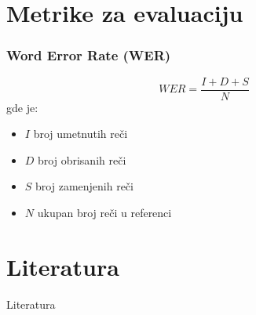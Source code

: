 \documentclass{beamer}
\begin{document}
\section{Metrike za evaluaciju}
\begin{frame}
  \frametitle{Word Error Rate (WER)}

  \begin{equation*}
    WER = \frac{I + D + S}{N}
  \end{equation*}
  gde je:
  \begin{itemize}
    \item $I$ broj umetnutih reči
    \item $D$ broj obrisanih reči
    \item $S$ broj zamenjenih reči
    \item $N$ ukupan broj reči u referenci
  \end{itemize}
\end{frame}

\section{Literatura}
\begin{frame}{Literatura}
     
    
\end{frame}
\end{document}
